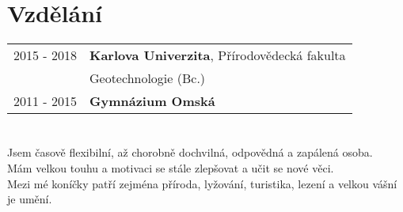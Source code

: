 \documentclass[12pt,a4paper]{article}
\begin{document}
\section*{Vzdělání}
\begin{tabular}{@{}p{2cm}l}
2015 - 2018 & {\bf Karlova Univerzita}, Přírodovědecká fakulta\\
 & Geotechnologie (Bc.)\\
2011 - 2015 & {\bf Gymnázium Omská}\\
\end{tabular}

\section*{}
Jsem časově flexibilní, až chorobně dochvilná, odpovědná a zapálená osoba.\\
Mám velkou touhu a motivaci se stále zlepšovat a učit se nové věci.\\
Mezi mé koníčky patří zejména příroda, lyžování, turistika, lezení a velkou vášní je umění.\\
\end{document}
